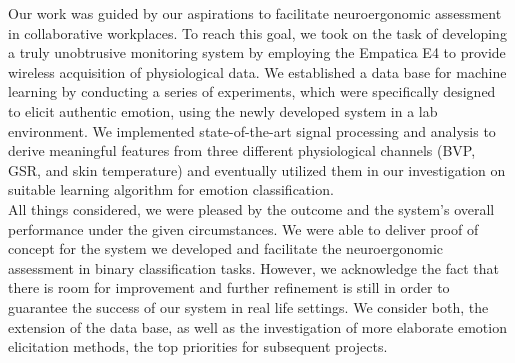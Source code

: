 
Our work was guided by our aspirations to facilitate neuroergonomic assessment in collaborative workplaces. To reach this goal, we took on the task of developing a truly unobtrusive monitoring system by employing the Empatica E4 to provide wireless acquisition of physiological data. We established a data base for machine learning by conducting a series of experiments, which were specifically designed to elicit authentic emotion, using the newly developed system in a lab environment. We implemented state-of-the-art signal processing and analysis to derive meaningful features from three different physiological channels (BVP, GSR, and skin temperature) and eventually utilized them in our investigation on suitable learning algorithm for emotion classification.\\
All things considered, we were pleased by the outcome and the system's overall performance under the given circumstances. We were able to deliver proof of concept for the system we developed and facilitate the neuroergonomic assessment in binary classification tasks. However, we acknowledge the fact that there is room for improvement and further refinement is still in order to guarantee the success of our system in real life settings. We consider both, the extension of the data base, as well as the investigation of more elaborate emotion elicitation methods, the top priorities for subsequent projects.




